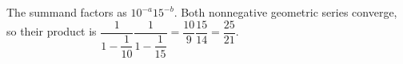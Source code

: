 The summand factors as $10^{-a}15^{-b}$. Both nonnegative geometric series converge, so their product is $\dfrac{1}{1-\dfrac{1}{10}}\dfrac{1}{1-\dfrac{1}{15}}=\dfrac{10}{9}\dfrac{15}{14}=\boxed{\dfrac{25}{21}}$.
